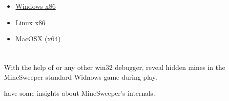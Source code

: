 \begin{itemize}
\item
\href{http://yurichev.com/RE-exercises/3/6/webserv_win32.rar}{Windows x86}

\item
\href{http://yurichev.com/RE-exercises/3/6/webserv_Linux_x86.tar}{Linux x86}

\item
\href{http://yurichev.com/RE-exercises/3/6/webserv_MacOSX_x64.tar}{MacOSX (x64)}
\end{itemize}

\section{}

{With the help of \tracer or any other win32 debugger, reveal hidden mines in the MineSweeper standard Widnows game
during play}.

 \cite{trew} 
{have some insights about MineSweeper's internals}.
